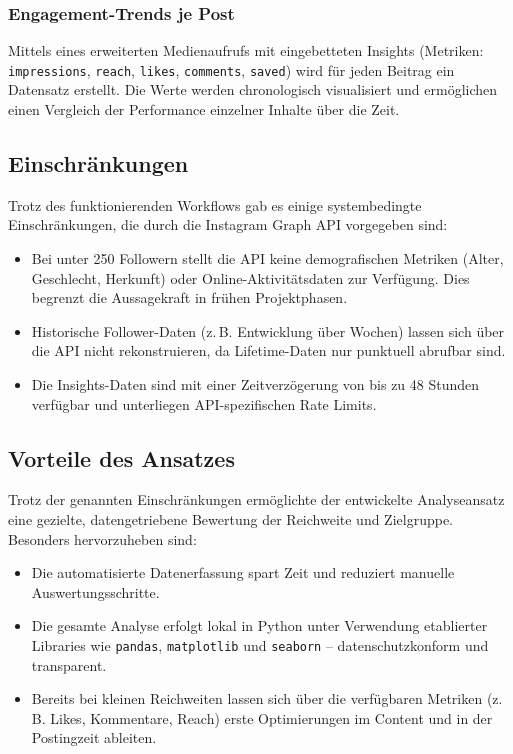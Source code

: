 \documentclass[a4paper,12pt]{article}
\begin{document}
\subsubsection*{Engagement-Trends je Post}

Mittels eines erweiterten Medienaufrufs mit eingebetteten Insights (Metriken: \texttt{impressions}, \texttt{reach}, \texttt{likes}, \texttt{comments}, \texttt{saved}) wird für jeden Beitrag ein Datensatz erstellt. Die Werte werden chronologisch visualisiert und ermöglichen einen Vergleich der Performance einzelner Inhalte über die Zeit.

\subsection{Einschränkungen}

Trotz des funktionierenden Workflows gab es einige systembedingte Einschränkungen, die durch die Instagram Graph API vorgegeben sind:

\begin{itemize}
    \item Bei unter 250 Followern stellt die API keine demografischen Metriken (Alter, Geschlecht, Herkunft) oder Online-Aktivitätsdaten zur Verfügung. Dies begrenzt die Aussagekraft in frühen Projektphasen.

    \item Historische Follower-Daten (z.\,B. Entwicklung über Wochen) lassen sich über die API nicht rekonstruieren, da Lifetime-Daten nur punktuell abrufbar sind.

    \item Die Insights-Daten sind mit einer Zeitverzögerung von bis zu 48 Stunden verfügbar und unterliegen API-spezifischen Rate Limits.
\end{itemize}

\subsection{Vorteile des Ansatzes}

Trotz der genannten Einschränkungen ermöglichte der entwickelte Analyseansatz eine gezielte, datengetriebene Bewertung der Reichweite und Zielgruppe. Besonders hervorzuheben sind:

\begin{itemize}
    \item Die automatisierte Datenerfassung spart Zeit und reduziert manuelle Auswertungsschritte.

    \item Die gesamte Analyse erfolgt lokal in Python unter Verwendung etablierter Libraries wie \texttt{pandas}, \texttt{matplotlib} und \texttt{seaborn} – datenschutzkonform und transparent.

    \item Bereits bei kleinen Reichweiten lassen sich über die verfügbaren Metriken (z.\,B. Likes, Kommentare, Reach) erste Optimierungen im Content und in der Postingzeit ableiten.
\end{itemize}
\end{document}
